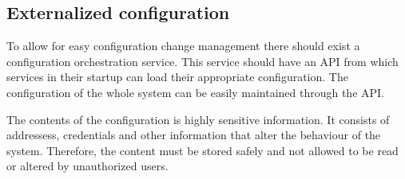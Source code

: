 

\subsection{Externalized configuration}
\begin{sloppypar}
    To allow for easy configuration change management there should exist a 
    configuration orchestration service. This service should have an API from 
    which services in their startup can load their appropriate configuration. 
    The configuration of the whole system can be easily maintained through the 
    API.
\end{sloppypar}
\begin{sloppypar}
    The contents of the configuration is highly sensitive information. It 
    consists of addressess, credentials and other information that alter 
    the behaviour of the system. Therefore, the content must be stored safely 
    and not allowed to be read or altered by unauthorized users.
\end{sloppypar}





